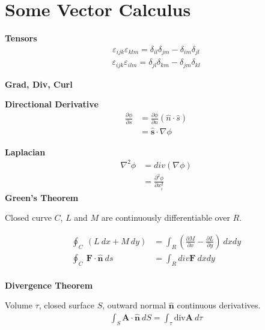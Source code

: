 \documentclass{article}
\begin{document}
\newpage


\section{Some Vector Calculus}
\Large \textbf{Tensors}
\begin{align*}
    \varepsilon_{ijk} \varepsilon_{klm} = \delta_{il} \delta_{jm} - \delta_{im} \delta_{jl}
\end{align*}
\begin{align*}
    \varepsilon_{ijk} \varepsilon_{ilm} = \delta_{jl} \delta_{km} - \delta_{jm} \delta_{kl}
\end{align*}
\newline


\noindent
\Large{\textbf{Grad, Div, Curl}}
\newline

\textbf{Directional Derivative}
\begin{align*}
    \frac{\partial \phi}{\partial s} &= \frac{\partial \phi}{\partial n} (\hat{n} \cdot  \hat{s}) \\
                                     &= \mathbf{\hat{s}} \cdot \nabla \phi
\end{align*}

\textbf{Laplacian}
\begin{align*}
    \nabla^2 \phi &= div(\nabla \phi) \\
                  &= \frac{\partial^2 \phi }{\partial x_i^2}
\end{align*}  
\noindent
\textbf{Green's Theorem}  
\begin{flushleft}
Closed curve $C$, $L$ and $M$ are continuously differentiable over $R$. 
\end{flushleft} 
\begin{align*}
    \oint_{C} \  (L \ dx + M \ dy) &= \int_{R} (\frac{\partial M}{\partial x}-\frac{\partial L}{\partial y}) \ dxdy \\
    \oint_{C} \  \mathbf{F} \cdot \mathbf{\hat{n}} \ ds &= \int_R div \mathbf{F} \  dxdy \\
\end{align*}
\newline
\newline

\noindent
\textbf{Divergence Theorem}  

Volume $\tau$, closed surface $S$, outward normal $\mathbf{\hat{n}}$ 
continuous derivatives.
\begin{align*}
    \int_S \mathbf{A} \cdot \mathbf{\hat{n}} \ dS= \int_{\tau} \text{div} \mathbf{A} \ d\tau
\end{align*}  
\newline
\end{document}
